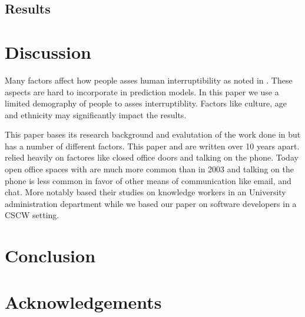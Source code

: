 \documentclass{sigchi}
\begin{document}
\subsection{Results}

\section{Discussion}


Many factors affect how people asses human interruptibility as noted in \cite{Avrahami2007}.
These aspects are hard to incorporate in prediction models.
In this paper we use a limited demography of people to asses interruptiblity.
Factors like culture, age and ethnicity may significantly impact the results.

This paper bases its research background and evalutation of the work done in \cite{fogarty2005predicting} but has a number of different factors. This paper and \cite{fogarty2005predicting} are written over 10 years apart. \cite{fogarty2005predicting} relied heavily on factores like closed office doors and talking on the phone. Today open office spaces with are much more common than in 2003 and talking on the phone is less common in favor of other means of communication like email, and chat. More notably \cite{fogarty2005predicting} based their studies on knowledge workers in an University administration department while we based our paper on software developers in a CSCW setting.




\section{Conclusion}

\section{Acknowledgements}

\balance



\end{document}
